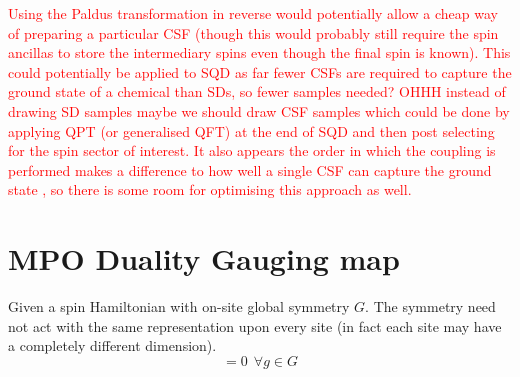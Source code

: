 \documentclass[aps,prx,twocolumn,floatfix,10pt,amssymb,amsfont,amsmath,superscriptaddress,float,nofootinbib,longbibliography,nobalancelastpage]{revtex4-2}
\begin{document}
\textcolor{red}{Using the Paldus transformation in reverse would potentially allow a cheap way of preparing a particular CSF (though this would probably still require the spin ancillas to store the intermediary spins even though the final spin is known). This could potentially be applied to SQD as far fewer CSFs are required to capture the ground state of a chemical than SDs, so fewer samples needed? OHHH instead of drawing SD samples maybe we should draw CSF samples which could be done by applying QPT (or generalised QFT) at the end of SQD and then post selecting for the spin sector of interest. It also appears the order in which the coupling is performed makes a difference to how well a single CSF can capture the ground state \cite{PhysRevB.105.195123}, so there is some room for optimising this approach as well.}


\section{MPO Duality Gauging map}
Given a spin Hamiltonian with on-site global symmetry $G$. The symmetry need not act with the same representation upon every site (in fact each site may have a completely different dimension). 
\begin{equation}
    [H, \bigotimes^n_i U_{\Gamma_i}(g) ] = 0 \> \> \forall g \in G
\end{equation}

\end{document}
